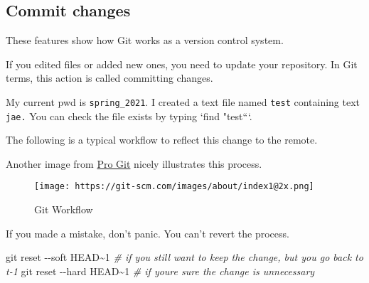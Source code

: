 \documentclass[
]{book}
\newenvironment{Shaded}{\begin{snugshade}}{\end{snugshade}}
\newcommand{\AttributeTok}[1]{\textcolor[rgb]{0.77,0.63,0.00}{#1}}
\newcommand{\CommentTok}[1]{\textcolor[rgb]{0.56,0.35,0.01}{\textit{#1}}}
\newcommand{\ExtensionTok}[1]{#1}
\newcommand{\FunctionTok}[1]{\textcolor[rgb]{0.00,0.00,0.00}{#1}}
\newcommand{\NormalTok}[1]{#1}
\newcommand{\StringTok}[1]{\textcolor[rgb]{0.31,0.60,0.02}{#1}}
\begin{document}
\hypertarget{commit-changes}{%
\subsection{Commit changes}\label{commit-changes}}

These features show how Git works as a version control system.

If you edited files or added new ones, you need to update your repository. In Git terms, this action is called committing changes.

My current pwd is \texttt{spring\_2021}. I created a text file named \texttt{test} containing text \texttt{jae.} You can check the file exists by typing `find "test```.

The following is a typical workflow to reflect this change to the remote.

\begin{Shaded}
\end{Shaded}

Another image from \href{https://git-scm.com/about/staging-area}{Pro Git} nicely illustrates this process.

\begin{figure}
\centering
\texttt{[image: https://git-scm.com/images/about/index1@2x.png]}
\caption{Git Workflow}
\end{figure}

If you made a mistake, don't panic. You can't revert the process.

\begin{Shaded}
\begin{Highlighting}[]
\FunctionTok{git}\NormalTok{ reset }\AttributeTok{{-}{-}soft}\NormalTok{ HEAD\textasciitilde{}1 }\CommentTok{\# if you still want to keep the change, but you go back to t{-}1 }
\FunctionTok{git}\NormalTok{ reset }\AttributeTok{{-}{-}hard}\NormalTok{ HEAD\textasciitilde{}1 }\CommentTok{\# if you\textquotesingle{}re sure the change is unnecessary }
\end{Highlighting}
\end{Shaded}
\end{document}
